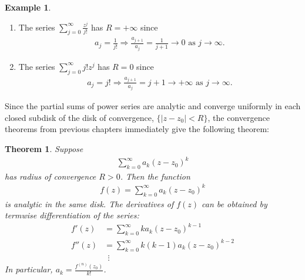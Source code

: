 \documentclass[12pt, a4paper]{article}
\theoremstyle{plain}
\newtheorem{thm}{Theorem} %
\theoremstyle{definition}
\newtheorem{example}{Example} %
\begin{document}
		\begin{example}
			\begin{enumerate}[label=(\roman*)]
				\item The series $\displaystyle\sum\limits_{j=0}^{\infty}\frac{z^j}{j!}$ has $R = +\infty$ since
				\begin{align*}
					a_j = \frac{1}{j!}\Rightarrow \frac{a_{j+1}}{a_j} = \frac{1}{j+1}\to 0\text{ as }j\to\infty.
				\end{align*}
				\item The series $\displaystyle\sum\limits_{j=0}^{\infty}j!z^j$ has $R = 0$ since
				\begin{align*}
					a_j = j!\Rightarrow \frac{a_{j+1}}{a_j} = {j+1}\to +\infty\text{ as }j\to\infty.
				\end{align*}
			\end{enumerate}
		\end{example}

		Since the partial sums of power series are analytic and converge uniformly in each closed subdisk of the disk of convergence, $\{|z-z_0|<R\}$, the convergence theorems from previous chapters immediately give the following theorem:\\

		\begin{thm}
			Suppose
			\begin{align*}
				\sum\limits_{k=0}^{\infty}a_k(z-z_0)^k
			\end{align*}
			has radius of convergence $R>0$. Then the function
			\begin{align*}
				f(z) = \sum\limits_{k=0}^{\infty}a_k(z-z_0)^k
			\end{align*}
			is analytic in the same disk. The derivatives of $f(z)$ can be obtained by termwise  differentiation of the series:
			\begin{align*}
				f'(z) &= \sum\limits_{k=0}^{\infty}ka_k(z-z_0)^{k-1}\\
				f''(z) &= \sum\limits_{k=0}^{\infty}k(k-1)a_k(z-z_0)^{k-2}\\
				&\:\:\vdots
			\end{align*}
			In particular, $\displaystyle a_k = \frac{f^{(n)}(z_0)}{k!}$.\\
		\end{thm}
\end{document}
